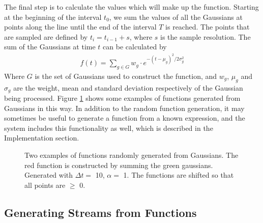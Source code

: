\documentclass[a4paper,11pt]{article}
\begin{document}
   The final step is to calculate the values which will make up the
   function. Starting at the beginning of the interval $t_0$, we sum the values
   of all the Gaussians at points along the line until the end of the interval
   $T$ is reached. The points that are sampled are defined by $t_i=t_{i-1}+s$,
   where $s$ is the sample resolution. The sum of the Gaussians at time $t$ can
   be calculated by
   \begin{align}
   f(t) = \sum_{g\in G}w_g\cdot e^{-(t-\mu_g)^2/2\sigma_g^2}
   \end{align}
   Where $G$ is the set of Gaussians used to construct the function, and $w_g$,
   $\mu_g$ and $\sigma_g$ are the weight, mean and standard deviation
   respectively of the Gaussian being processed. Figure \ref{fig:contrib} shows
   some examples of functions generated from Gaussians in this way. In addition
   to the random function generation, it may sometimes be useful to generate a
   function from a known expression, and the system includes this functionality
   as well, which is described in the Implementation section.
   \begin{figure}
   \caption{Two examples of functions randomly generated from Gaussians. The red
   function is constructed by summing the green gaussians. Generated with
   $\Delta t=$ 10, $\alpha=$ 1. The functions are shifted so that all points
   are $\geq$ 0.}
   \label{fig:contrib}
   \end{figure}
\subsection{Generating Streams from Functions}
\label{sec-3-2}
\end{document}
